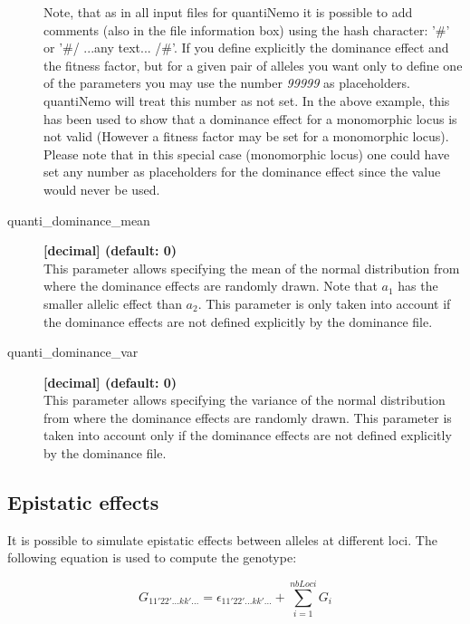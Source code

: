 \documentclass[letterpaper,12pt,oneside]{book}
\begin{document}
\begin{description}
\begin{description}
\end{description} 
Note, that as in all input files for quantiNemo it is possible to add comments (also in the file information box) using the hash character: '\#' or '\#/ ...any text... /\#'. If you define explicitly the dominance effect and the fitness factor, but for a given pair of alleles you want only to define one of the parameters you may use the number \textit{99999} as placeholders. quantiNemo will treat this number as not set. In the above example, this has been used to show that a dominance effect for a monomorphic locus is not valid (However a fitness factor may be set for a monomorphic locus). Please note that in this special case (monomorphic locus) one could have set any number as placeholders for the dominance effect since the value would never be used.   

\item[quanti\_dominance\_mean\index{quanti\_dominance\_mean}] \textbf{[decimal] (default: 0)} \\
This parameter allows specifying the mean of the normal distribution from where the dominance effects are randomly drawn. Note that $a_{1}$ has the smaller allelic effect than $a_{2}$. This parameter is only taken into account if the dominance effects are not defined explicitly by the dominance file.

\item[quanti\_dominance\_var\index{quanti\_dominance\_var}] \textbf{[decimal] (default: 0)} \\
This parameter allows specifying the variance of the normal distribution from where the dominance effects are randomly drawn. This parameter is taken into account only if the dominance effects are not defined explicitly by the dominance file.
\end{description} 


\subsection{Epistatic effects}
\label{sub:EpistaticEffects}
It is possible to simulate epistatic effects between alleles at different loci. The following equation is used to compute the genotype:

\[G_{11'22'...kk'...}=\epsilon_{11'22'...kk'...}+\sum_{i=1}^{nbLoci}G_{i} \]
\end{document}
